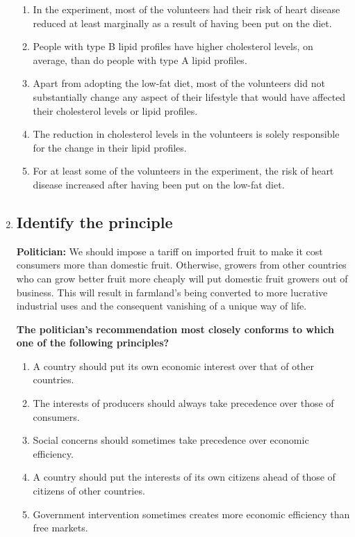 \documentclass[9pt]{article}
\begin{document}
\begin{multicols}{3}
\begin{enumerate}
\begin{enumerate}[label=(\alph*)]
    \item In the experiment, most of the volunteers had their risk of heart disease reduced at least marginally as a result of having been put on the diet.
    \item People with type B lipid profiles have higher cholesterol levels, on average, than do people with type A lipid profiles.
    \item Apart from adopting the low-fat diet, most of the volunteers did not substantially change any aspect of their lifestyle that would have affected their cholesterol levels or lipid profiles.
    \item The reduction in cholesterol levels in the volunteers is solely responsible for the change in their lipid profiles.
    \item For at least some of the volunteers in the experiment, the risk of heart disease increased after having been put on the low-fat diet.
\end{enumerate}

\item
\subsection*{Identify the principle}
\noindent
\textbf{Politician:} We should impose a tariff on imported fruit to make it cost consumers more than domestic fruit. Otherwise, growers from other countries who can grow better fruit more cheaply will put domestic fruit growers out of business. This will result in farmland's being converted to more lucrative industrial uses and the consequent vanishing of a unique way of life.

 

\noindent
\textbf{The politician's recommendation most closely conforms to which one of the following principles?}

\begin{enumerate}[label=(\alph*)]
    \item A country should put its own economic interest over that of other countries.
    \item The interests of producers should always take precedence over those of consumers.
    \item Social concerns should sometimes take precedence over economic efficiency.
    \item A country should put the interests of its own citizens ahead of those of citizens of other countries.
    \item Government intervention sometimes creates more economic efficiency than free markets.
\end{enumerate}


\end{enumerate}
\end{multicols}
\end{document}
